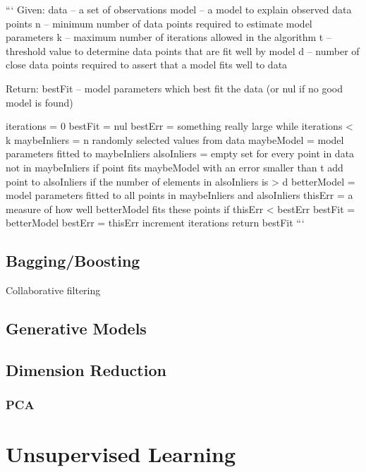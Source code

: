{{```
Given:
    data – a set of observations
    model – a model to explain observed data points
    n – minimum number of data points required to estimate model parameters
    k – maximum number of iterations allowed in the algorithm
    t – threshold value to determine data points that are fit well by model 
    d – number of close data points required to assert that a model fits well to data

Return:
    bestFit – model parameters which best fit the data (or nul if no good model is found)

iterations = 0
bestFit = nul
bestErr = something really large
while iterations < k {
    maybeInliers = n randomly selected values from data
    maybeModel = model parameters fitted to maybeInliers
    alsoInliers = empty set
    for every point in data not in maybeInliers {
        if point fits maybeModel with an error smaller than t
             add point to alsoInliers
    }
    if the number of elements in alsoInliers is > d {
        betterModel = model parameters fitted to all points in maybeInliers and alsoInliers
        thisErr = a measure of how well betterModel fits these points
        if thisErr < bestErr {
            bestFit = betterModel
            bestErr = thisErr
        }
    }
    increment iterations
}
return bestFit
```



\section{Bagging/Boosting}

Collaborative filtering

\section{Generative Models}

\section{Dimension Reduction}

\subsection{PCA}

\chapter{Unsupervised Learning}

}}
